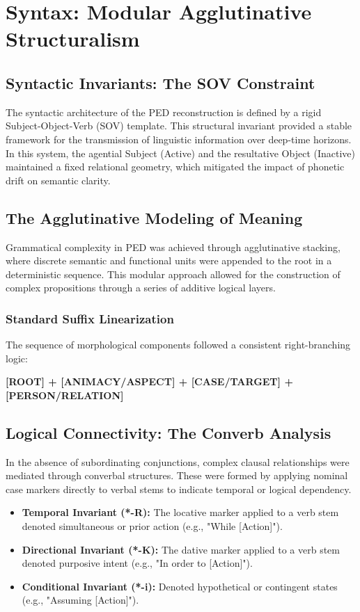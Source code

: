 \chapter{Syntax: Modular Agglutinative Structuralism}

\section{Syntactic Invariants: The SOV Constraint}
The syntactic architecture of the PED reconstruction is defined by a rigid Subject-Object-Verb (SOV) template. This structural invariant provided a stable framework for the transmission of linguistic information over deep-time horizons. In this system, the agential Subject (Active) and the resultative Object (Inactive) maintained a fixed relational geometry, which mitigated the impact of phonetic drift on semantic clarity.

\section{The Agglutinative Modeling of Meaning}
Grammatical complexity in PED was achieved through agglutinative stacking, where discrete semantic and functional units were appended to the root in a deterministic sequence. This modular approach allowed for the construction of complex propositions through a series of additive logical layers.

\subsection{Standard Suffix Linearization}
The sequence of morphological components followed a consistent right-branching logic:
\begin{center}
\textbf{[ROOT] + [ANIMACY/ASPECT] + [CASE/TARGET] + [PERSON/RELATION]}
\end{center}

\section{Logical Connectivity: The Converb Analysis}
In the absence of subordinating conjunctions, complex clausal relationships were mediated through converbal structures. These were formed by applying nominal case markers directly to verbal stems to indicate temporal or logical dependency.
\begin{itemize}
    \item \textbf{Temporal Invariant (*-R):} The locative marker applied to a verb stem denoted simultaneous or prior action (e.g., "While [Action]").
    \item \textbf{Directional Invariant (*-K):} The dative marker applied to a verb stem denoted purposive intent (e.g., "In order to [Action]").
    \item \textbf{Conditional Invariant (*-i):} Denoted hypothetical or contingent states (e.g., "Assuming [Action]").
\end{itemize}

